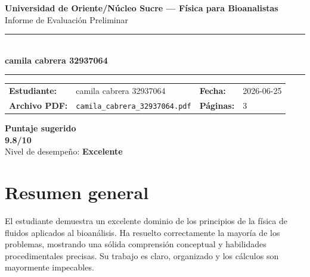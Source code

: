 \documentclass[11pt,a4paper]{article}
\begin{document}
\begin{center}
  {\Large\bfseries\color{azulTitulo} Universidad de Oriente/Núcleo Sucre --- Física para Bioanalistas}\\[4pt]
  {\large Informe de Evaluación Preliminar}\\[12pt]
  \rule{\linewidth}{1.2pt}\\[6pt]
  {\LARGE\bfseries camila cabrera 32937064}\\[4pt]
  \rule{\linewidth}{0.6pt}
\end{center}

\vspace{4pt}
\begin{tcolorbox}[cajaTitulo, title=Datos del informe]
\begin{tabular}{@{}llll@{}}
  \textbf{Estudiante:}  & camila cabrera 32937064  &
  \textbf{Fecha:}       & 2026-06-25 \\[4pt]
  \textbf{Archivo PDF:} & \texttt{camila\_cabrera\_32937064.pdf}  &
  \textbf{Páginas:}     & 3 \\
\end{tabular}
\end{tcolorbox}

\vspace{6pt}
\begin{center}
  \begin{tcolorbox}[
    enhanced,
    colback=white, colframe=desempeno_excelente,
    width=0.62\linewidth,
    boxrule=2pt,
    halign=center, valign=center,
    top=8pt, bottom=8pt,
  ]
    \centering
    {\large\bfseries Puntaje sugerido}\\[6pt]
    {\Huge\bfseries\color{desempeno_excelente} 9.8/10}\\[6pt]
    {\large Nivel de desempeño: \textbf{\color{desempeno_excelente} Excelente}}
  \end{tcolorbox}
\end{center}

\section*{Resumen general}
El estudiante demuestra un excelente dominio de los principios de la física de fluidos aplicados al bioanálisis. Ha resuelto correctamente la mayoría de los problemas, mostrando una sólida comprensión conceptual y habilidades procedimentales precisas. Su trabajo es claro, organizado y los cálculos son mayormente impecables.
\end{document}
